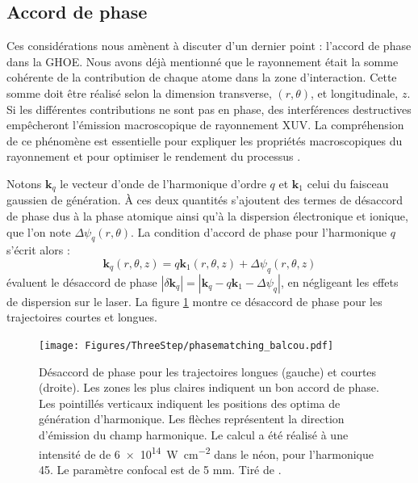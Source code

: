 \subsection{Accord de phase}
Ces considérations nous amènent à discuter d'un dernier point : l'accord de phase dans la GHOE. Nous avons déjà mentionné que le rayonnement était la somme cohérente de la contribution de chaque atome dans la zone d'interaction. Cette somme doit être réalisé selon la dimension transverse, $(r,\theta)$, et longitudinale, $z$. Si les différentes contributions ne sont pas en phase, des interférences destructives empêcheront l'émission macroscopique de rayonnement XUV. La compréhension de ce phénomène est essentielle pour expliquer les propriétés macroscopiques du rayonnement  et pour optimiser le rendement du processus .

Notons $\bm{k}_q$ le vecteur d'onde de l'harmonique d'ordre $q$ et $\bm{k}_1$ celui du faisceau gaussien de génération. \`A ces deux quantités s'ajoutent des termes de désaccord de phase dus à la phase atomique ainsi qu'à la dispersion électronique et ionique, que l'on note $\Delta \psi_q(r,\theta)$. La condition d'accord de phase pour l'harmonique $q$ s'écrit alors  :
\begin{equation}
\bm{k}_q(r,\theta,z) = q\bm{k}_1(r,\theta,z) + \Delta \psi_q(r,\theta,z)
\end{equation}
 évaluent le désaccord de phase $|\delta \bm{k}_q| = |\bm{k}_q-q\bm{k}_1 - \Delta \psi_q|$, en négligeant les effets de dispersion sur le laser. La figure \ref{fig:balcou} montre ce désaccord de phase pour les trajectoires courtes et longues. 

\begin{figure}[!ht]
\centering
\texttt{[image: Figures/ThreeStep/phasematching\_balcou.pdf]}%
\caption{Désaccord de phase pour les trajectoires longues (gauche) et courtes (droite). Les zones les plus claires indiquent un bon accord de phase. Les pointillés verticaux indiquent les positions des optima de génération d'harmonique. Les flèches représentent la direction d'émission du champ harmonique. Le calcul a été réalisé à une intensité de de \SI{6e14}{\W\per\cm\squared} dans le néon, pour l'harmonique 45. Le paramètre confocal est de 5 mm. Tiré de .}
\label{fig:balcou}
\end{figure}

